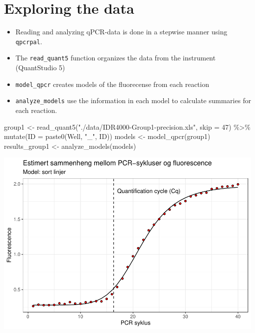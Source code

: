 \documentclass[
]{book}
\newenvironment{Shaded}{\begin{snugshade}}{\end{snugshade}}
\newcommand{\AttributeTok}[1]{\textcolor[rgb]{0.77,0.63,0.00}{#1}}
\newcommand{\DecValTok}[1]{\textcolor[rgb]{0.00,0.00,0.81}{#1}}
\newcommand{\FunctionTok}[1]{\textcolor[rgb]{0.00,0.00,0.00}{#1}}
\newcommand{\NormalTok}[1]{#1}
\newcommand{\OtherTok}[1]{\textcolor[rgb]{0.56,0.35,0.01}{#1}}
\newcommand{\SpecialCharTok}[1]{\textcolor[rgb]{0.00,0.00,0.00}{#1}}
\newcommand{\StringTok}[1]{\textcolor[rgb]{0.31,0.60,0.02}{#1}}
\providecommand{\tightlist}{%
  \setlength{\itemsep}{0pt}\setlength{\parskip}{0pt}}
\begin{document}
\hypertarget{exploring-the-data}{%
\section{Exploring the data}\label{exploring-the-data}}

\begin{itemize}
\tightlist
\item
  Reading and analyzing qPCR-data is done in a stepwise manner using \texttt{qpcrpal}.
\item
  The \texttt{read\_quant5} function organizes the data from the instrument (QuantStudio 5)
\item
  \texttt{model\_qpcr} creates models of the fluorecense from each reaction
\item
  \texttt{analyze\_models} use the information in each model to calculate summaries for each reaction.
\end{itemize}

\begin{Shaded}
\begin{Highlighting}[]
\NormalTok{group1 }\OtherTok{\textless{}{-}} \FunctionTok{read\_quant5}\NormalTok{(}\StringTok{"./data/IDR4000{-}Group1{-}precision.xls"}\NormalTok{, }\AttributeTok{skip =} \DecValTok{47}\NormalTok{) }\SpecialCharTok{\%\textgreater{}\%}
  \FunctionTok{mutate}\NormalTok{(}\AttributeTok{ID =} \FunctionTok{paste0}\NormalTok{(Well, }\StringTok{"\_"}\NormalTok{, ID))}
\NormalTok{models }\OtherTok{\textless{}{-}} \FunctionTok{model\_qpcr}\NormalTok{(group1)}
\NormalTok{results\_group1 }\OtherTok{\textless{}{-}} \FunctionTok{analyze\_models}\NormalTok{(models)}
\end{Highlighting}
\end{Shaded}

\includegraphics{_main_files/figure-latex/unnamed-chunk-3-1.pdf}
\end{document}
